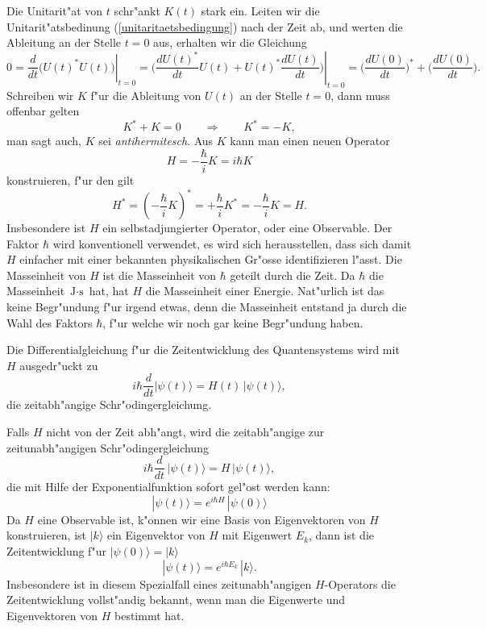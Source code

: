 Die Unitarit"at von $t$ schr"ankt $K(t)$ stark ein. Leiten wir die
Unitarit"atsbedinung (\ref{unitaritaetsbedingung}) nach der Zeit ab,
und werten die Ableitung an der Stelle $t=0$ aus,
erhalten wir die Gleichung
\[
0
=
\left.\frac{d}{dt}\bigl(U(t)^*U(t)\bigr)\right|_{t=0}
=
\left.
\biggl(
\frac{dU(t)^*}{dt}U(t)+U(t)^*\frac{dU(t)}{dt}
\biggr)
\right|_{t=0}
=
\biggl(\frac{dU(0)}{dt}\biggr)^*
+
\biggl(\frac{dU(0)}{dt}\biggr).
\]
Schreiben wir $K$ f"ur die Ableitung von $U(t)$ an der Stelle $t=0$,
dann muss offenbar gelten
\[
K^*+K=0\qquad\Rightarrow\qquad K^*=-K,
\]
man sagt auch, $K$ sei {\em antihermitesch}. Aus $K$ kann man einen
neuen Operator
\[
H=-\frac{\hbar}{i}K=i\hbar K
\]
konstruieren, f"ur den gilt
\[
H^*
=
\left(-\frac{\hbar}{i}K\right)^*
=
+\frac{\hbar}{i}K^*
=
-\frac{\hbar}{i}K=H.
\]
Insbesondere ist $H$ ein selbstadjungierter Operator, oder
eine Observable.
Der Faktor $\hbar$ wird konventionell verwendet, es wird sich
herausstellen, dass sich damit $H$ einfacher mit einer bekannten
physikalischen Gr"osse identifizieren l"asst.
Die Masseinheit von $H$ ist die Masseinheit von $\hbar$ geteilt durch die Zeit.
Da $\hbar$ die Masseinheit $\text{J}\cdot\text{s}$ hat, hat
$H$ die Masseinheit einer Energie.
Nat"urlich ist das keine Begr"undung f"ur irgend etwas, denn die
Masseinheit entstand ja durch die Wahl des Faktors $\hbar$, f"ur
welche wir noch gar keine Begr"undung haben.

Die Differentialgleichung f"ur die Zeitentwicklung des Quantensystems wird
mit $H$ ausgedr"uckt zu
\begin{equation}
i\hbar\frac{d}{dt}|\psi(t)\rangle = H(t)\,|\psi(t)\rangle,
\label{schroedingergleichungt}
\end{equation}
die {\rm zeitabh"angige Schr"odingergleichung}.

Falls $H$ nicht von der Zeit abh"angt, wird die zeitabh"angige zur
zeitunabh"angigen Schr"odingergleichung
\begin{equation}
i\hbar \frac{d}{dt}\,|\psi(t)\rangle = H\,|\psi(t)\rangle,
\label{schroedingergleichung}
\end{equation}
die mit Hilfe der Exponentialfunktion sofort gel"ost werden kann:
\[
|\psi(t)\rangle = e^{i\hbar H}\,|\psi(0)\rangle
\]
Da $H$ eine Observable ist, k"onnen wir eine Basis von Eigenvektoren
von $H$ konstruieren, ist $|k\rangle$ ein Eigenvektor von $H$ mit
Eigenwert $E_k$, dann ist die Zeitentwicklung f"ur $|\psi(0)\rangle = |k\rangle$
\[
|\psi(t)\rangle
=
e^{i\hbar E_k}\,|k\rangle.
\]
Insbesondere ist in diesem Spezialfall eines zeitunabh"angigen $H$-Operators
die Zeitentwicklung vollst"andig bekannt, wenn man die Eigenwerte und
Eigenvektoren von $H$ bestimmt hat.


